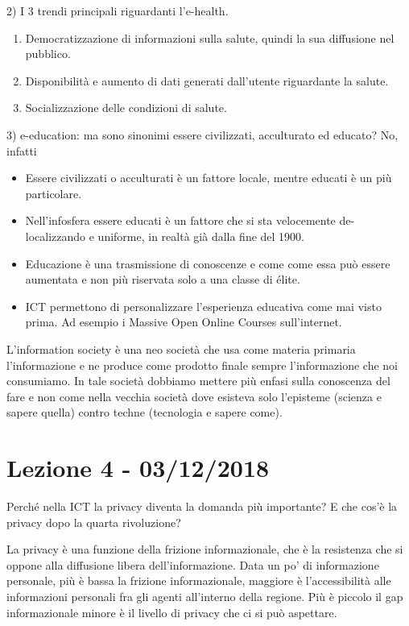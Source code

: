 \documentclass[]{article}
\begin{document}
2) I 3 trendi principali riguardanti l'e-health.

\begin{enumerate}
	\def\labelenumi{\arabic{enumi}.}
	 
	\item
	Democratizzazione di informazioni sulla salute, quindi la sua
	diffusione nel pubblico.
	\item
	Disponibilità e aumento di dati generati dall'utente riguardante la salute.
	\item
	Socializzazione delle condizioni di salute.
\end{enumerate}

3) e-education: ma sono sinonimi essere civilizzati, acculturato ed
educato? No, infatti

\begin{itemize}
	 
	\item
	Essere civilizzati o acculturati è un fattore locale, mentre educati è
	un più particolare.
	\item
	Nell'infosfera essere educati è un fattore che si sta velocemente
	de-localizzando e uniforme, in realtà già dalla fine del 1900.
	\item
	Educazione è una trasmissione di conoscenze e come come essa può
	essere aumentata e non più riservata solo a una classe di élite.
	\item
	ICT permettono di personalizzare l'esperienza educativa come mai visto
	prima. Ad esempio i Massive Open Online Courses sull'internet.
\end{itemize}

L'information society è una neo società che usa come materia primaria
l'informazione e ne produce come prodotto finale sempre l'informazione
che noi consumiamo. In tale società dobbiamo mettere più enfasi sulla
conoscenza del fare e non come nella vecchia società dove esisteva solo
l'episteme (scienza e sapere quella) contro techne (tecnologia e sapere
come).
\section*{Lezione 4 - 03/12/2018}

Perché nella ICT la privacy diventa la domanda più importante? E che
cos'è la privacy dopo la quarta rivoluzione?

La privacy è una funzione della frizione informazionale, che è la
resistenza che si oppone alla diffusione libera dell'informazione. Data
un po' di informazione personale, più è bassa la frizione
informazionale, maggiore è l'accessibilità alle informazioni personali
fra gli agenti all'interno della regione. Più è piccolo il gap
informazionale minore è il livello di privacy che ci si può aspettare.
\end{document}

